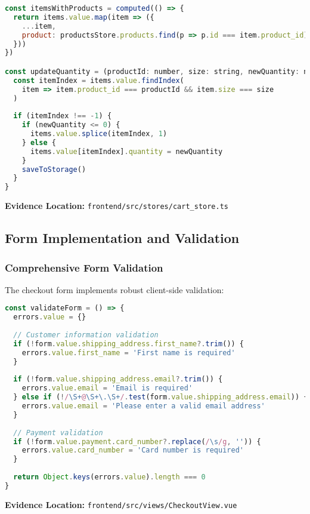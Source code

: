 \documentclass[12pt,a4paper]{article}
\begin{document}
\begin{lstlisting}[language=javascript, caption=Cart Item Management]
const itemsWithProducts = computed(() => {
  return items.value.map(item => ({
    ...item,
    product: productsStore.products.find(p => p.id === item.product_id)
  }))
})

const updateQuantity = (productId: number, size: string, newQuantity: number) => {
  const itemIndex = items.value.findIndex(
    item => item.product_id === productId && item.size === size
  )
  
  if (itemIndex !== -1) {
    if (newQuantity <= 0) {
      items.value.splice(itemIndex, 1)
    } else {
      items.value[itemIndex].quantity = newQuantity
    }
    saveToStorage()
  }
}
\end{lstlisting}

\textbf{Evidence Location:} \texttt{frontend/src/stores/cart\_store.ts}

\subsection{Form Implementation and Validation}

\subsubsection{Comprehensive Form Validation}
The checkout form implements robust client-side validation:

\begin{lstlisting}[language=javascript, caption=Form Validation Logic]
const validateForm = () => {
  errors.value = {}
  
  // Customer information validation
  if (!form.value.shipping_address.first_name?.trim()) {
    errors.value.first_name = 'First name is required'
  }
  
  if (!form.value.shipping_address.email?.trim()) {
    errors.value.email = 'Email is required'
  } else if (!/\S+@\S+\.\S+/.test(form.value.shipping_address.email)) {
    errors.value.email = 'Please enter a valid email address'
  }
  
  // Payment validation
  if (!form.value.payment.card_number?.replace(/\s/g, '')) {
    errors.value.card_number = 'Card number is required'
  }
  
  return Object.keys(errors.value).length === 0
}
\end{lstlisting}

\textbf{Evidence Location:} \texttt{frontend/src/views/CheckoutView.vue}
\end{document}
